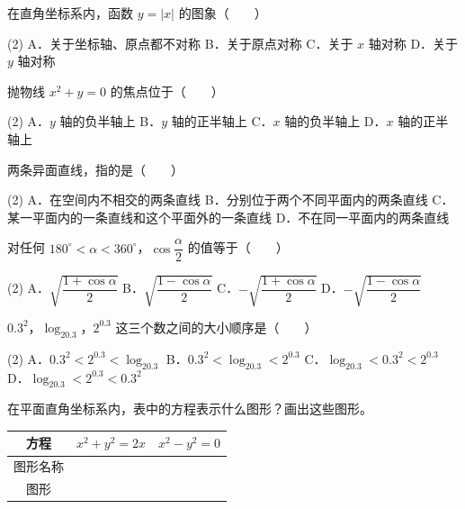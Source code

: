 \begin{question}
在直角坐标系内，函数 $y=|x|$ 的图象\mbox{（　　）}

\begin{gkopts}(2)
\task A．关于坐标轴、原点都不对称
\task B．关于原点对称
\task C．关于 $x$ 轴对称
\task D．关于 $y$ 轴对称
\end{gkopts}

\end{question}
\begin{question}
抛物线 $x^2+y=0$ 的焦点位于\mbox{（　　）}

\begin{gkopts}(2)
\task A．$y$ 轴的负半轴上
\task B．$y$ 轴的正半轴上
\task C．$x$ 轴的负半轴上
\task D．$x$ 轴的正半轴上
\end{gkopts}

\end{question}
\begin{question}
两条异面直线，指的是\mbox{（　　）}

\begin{gkopts}(2)
\task A．在空间内不相交的两条直线
\task B．分别位于两个不同平面内的两条直线
\task C．某一平面内的一条直线和这个平面外的一条直线
\task D．不在同一平面内的两条直线
\end{gkopts}

\end{question}
\begin{question}
对任何 $180^\circ<\alpha<360^\circ$，$\cos\dfrac{\alpha}{2}$ 的值等于\mbox{（　　）}

\begin{gkopts}(2)
\task A．$\sqrt{\dfrac{1+\cos\alpha}{2}}$
\task B．$\sqrt{\dfrac{1-\cos\alpha}{2}}$
\task C．$-\sqrt{\dfrac{1+\cos\alpha}{2}}$
\task D．$-\sqrt{\dfrac{1-\cos\alpha}{2}}$
\end{gkopts}

\end{question}
\begin{question}
$0.3^2$，$\log_20.3$，$2^{0.3}$ 这三个数之间的大小顺序是\mbox{（　　）}

\begin{gkopts}(2)
\task A．$0.3^2<2^{0.3}<\log_20.3$
\task B．$0.3^2<\log_20.3<2^{0.3}$
\task C．$\log_20.3<0.3^2<2^{0.3}$
\task D．$\log_20.3<2^{0.3}<0.3^2$
\end{gkopts}

\end{question}
\begin{question}
在平面直角坐标系内，表中的方程表示什么图形？画出这些图形。

\begin{center}
\begin{tabular}{cll}
\toprule
方程 & $x^2+y^2=2x$ & $x^2-y^2=0$ \\
\midrule
图形名称 &  &  \\
图形 &  &  \\
\bottomrule
\end{tabular}
\end{center}

\end{question}
